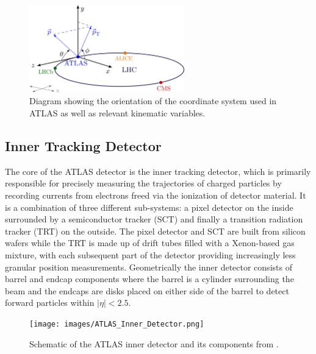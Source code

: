 \begin{figure}
\centering
    \includegraphics[width=0.6\textwidth]{images/ATLAS_Coordinate_System.png}
    \caption{Diagram showing the orientation of the coordinate system used in ATLAS as well as relevant kinematic 
    variables.}
    \label{fig:ATLAS_Coordinate_System}
\end{figure}

\subsection{Inner Tracking Detector}

The core of the ATLAS detector \cite{atlas-detector} is the inner tracking detector, which is primarily responsible 
for precisely measuring the trajectories of charged particles by recording currents from electrons freed via the 
ionization of detector material. It is a combination of three different sub-systems: a pixel detector on the inside 
surrounded by a semiconductor tracker (SCT) and finally a transition radiation tracker (TRT) on the outside. The pixel 
detector and SCT are built from silicon wafers while the TRT is made up of drift tubes filled with a Xenon-based gas 
mixture, with each subsequent part of the detector providing increasingly less granular position measurements. 
Geometrically the inner detector consists of barrel and endcap components where the barrel is a cylinder surrounding 
the beam and the endcaps are disks placed on either side of the barrel to detect forward particles within 
$|\eta| < 2.5$. \par

\begin{figure}
\centering
    \texttt{[image: images/ATLAS\_Inner\_Detector.png]}
    \caption{Schematic of the ATLAS inner detector and its components from \cite{atlas-run3-setup}.}
    \label{fig:ATLAS_Inner_Detector}
\end{figure}


